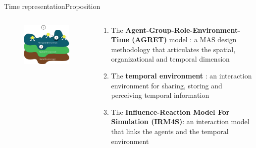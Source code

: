 \begin{frame}{Time representation}{Proposition}
\begin{columns}
\begin{column}{.30\linewidth}
    \begin{figure}
	\includegraphics[width=1.2\textwidth]{figures/temporalRepresentation.png}
    \end{figure}
\end{column}
\begin{column}{.60\linewidth}
\begin{enumerate}
    \item The \textbf{Agent-Group-Role-Environment-Time (AGRET)} model : a MAS design methodology that articulates the spatial, organizational and temporal dimension
    \medbreak
    \item The \textbf{temporal environment} : an interaction environment for sharing, storing and perceiving temporal information
    \medbreak
    \item The \textbf{Influence-Reaction Model For Simulation (IRM4S)}: an interaction model that links the agents and the temporal environment
\end{enumerate}
\end{column}
\end{columns}
    

\end{frame}

